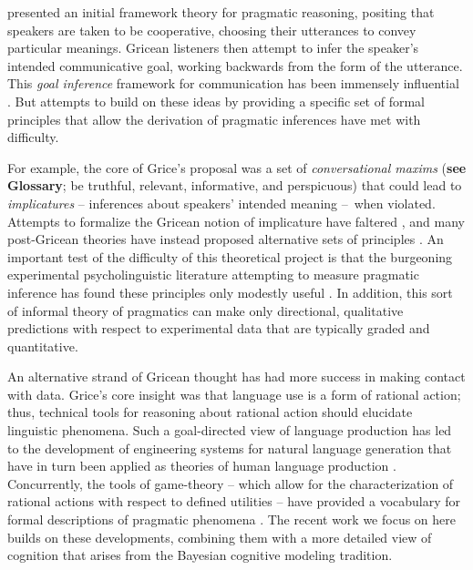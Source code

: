 \documentclass[]{elsarticle}
\begin{document}
\citet{grice1975} presented an initial framework theory for pragmatic
reasoning, positing that speakers are taken to be cooperative, choosing
their utterances to convey particular meanings. Gricean listeners then
attempt to infer the speaker's intended communicative goal, working
backwards from the form of the utterance. This \emph{goal inference}
framework for communication has been immensely influential \cite[e.g.,][]{horn1984,sperber1986,clark1996,levinson2000}. But
attempts to build on these ideas by providing a specific set of formal
principles that allow the derivation of pragmatic inferences have met
with difficulty.

For example, the core of Grice's proposal was a set of
\emph{conversational maxims} (\textbf{see Glossary}; be truthful,
relevant, informative, and perspicuous) that could lead to
\emph{implicatures} -- inferences about speakers' intended meaning
--~when violated. Attempts to formalize the Gricean notion of
implicature have faltered \cite[e.g.,][]{hirschberg1985}, and many
post-Gricean theories have instead proposed alternative sets of
principles \citep{sperber1986,levinson2000}. An important test
of the difficulty of this theoretical project is that the burgeoning
experimental psycholinguistic literature attempting to measure pragmatic
inference has found these principles only modestly useful \citep{breheny2006,huang2009,noveck2008}. In addition, this sort of informal theory of pragmatics can make only directional,
qualitative predictions with respect to experimental data that are typically graded and
quantitative.

An alternative strand of Gricean thought has had more success in making
contact with data. Grice's core insight was that language use is a form
of rational action; thus, technical tools for reasoning about rational
action should elucidate linguistic phenomena. Such a goal-directed view
of language production has led to the development of engineering systems
for natural language generation \citep{dale1995} that have in turn
been applied as theories of human language production \citep[e.g.,][]{viethen2006}. Concurrently, the tools of game-theory -- which allow for
the characterization of rational actions with respect to defined
utilities -- have provided a vocabulary for formal descriptions of
pragmatic phenomena \citep[e.g.,][]{benz2006,jager2008}. The recent work we focus on
here builds on these developments, combining them with a more detailed
view of cognition that arises from the Bayesian cognitive modeling
tradition.
\end{document}
